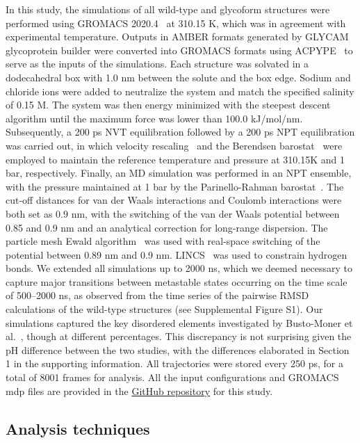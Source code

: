 \documentclass[sn-vancouver]{sn-jnl}
\begin{document}
In this study, the simulations of all wild-type and glycoform structures were performed using GROMACS 2020.4~\cite{abraham2015gromacs, pall2014tackling} at 310.15 K, which was in agreement with experimental temperature. Outputs in AMBER formats generated by GLYCAM glycoprotein builder were converted into GROMACS formats using ACPYPE~\cite{da2012acpype} to serve as the inputs of the simulations. Each structure was solvated in a dodecahedral box with 1.0 nm between the solute and the box edge. Sodium and chloride ions were added to neutralize the system and match the specified salinity of 0.15 M. The system was then energy minimized with the steepest descent algorithm until the maximum force was lower than 100.0 kJ/mol/nm. Subsequently, a 200 ps NVT equilibration followed by a 200 ps NPT equilibration was carried out, in which velocity rescaling~\cite{bussi2007canonical} and the Berendsen barostat~\cite{berendsen1984molecular} were employed to maintain the reference temperature and pressure at 310.15K and 1 bar, respectively. Finally, an MD simulation was performed in an NPT ensemble, with the pressure maintained at 1 bar by the Parinello-Rahman barostat~\cite{parrinello1980crystal, parrinello1981polymorphic}. The cut-off distances for van der Waals interactions and Coulomb interactions were both set as 0.9 nm, with the switching of the van der Waals potential between 0.85 and 0.9 nm and an analytical correction for long-range dispersion. The particle mesh Ewald algorithm~\cite{essmann1995smooth} was used with real-space switching of the potential between 0.89 nm and 0.9 nm. LINCS~\cite{lincs} was used to constrain hydrogen bonds. We extended all simulations up to 2000 ns, which we deemed necessary to capture major transitions between metastable states occurring on the time scale of 500--2000 ns, as observed from the time series of the pairwise RMSD calculations of the wild-type structures (see Supplemental Figure S1).  Our simulations captured the key disordered elements investigated by Busto-Moner et al.~\cite{busto2021structural}, though at different percentages. This discrepancy is not surprising given the pH difference between the two studies, with the differences elaborated in Section 1 in the supporting information.  All trajectories were stored every 250 ps, for a total of 8001 frames for analysis. All the input configurations and GROMACS mdp files are provided in the \href{https://github.com/shirtsgroup/Glycoinsulin_project}{GitHub repository} for this study.

\subsection{Analysis techniques} \label{analysis_method}
\end{document}

